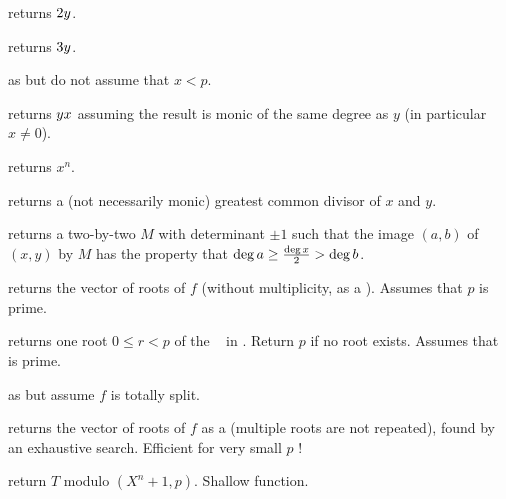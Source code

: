  returns $2\*y$.

 returns $3\*y$.

 as  but do not
assume that $x<p$.

 returns $y\*x$
assuming the result is monic of the same degree as $y$ (in particular $x\neq
0$).


 returns $x^n$.







 returns a (not necessarily monic)
greatest common divisor of $x$  and $y$.

 returns a two-by-two 
$M$ with determinant $\pm 1$ such that the image $(a,b)$ of $(x,y)$ by $M$
has the property that $\deg a \geq {\deg x \over 2} > \deg b$.


 returns the vector of roots
of $f$ (without multiplicity, as a ). Assumes that $p$ is
prime.

 returns one root $0 \leq r < p$ of
the ~ in . Return $p$ if no root exists. Assumes
that  is prime.

 as  but
assume $f$ is totally split.

 returns the vector of roots
of $f$ as a  (multiple roots are not repeated), found
by an exhaustive search. Efficient for very small $p$ !


 return $T$ modulo
$(X^n + 1, p)$. Shallow function.

